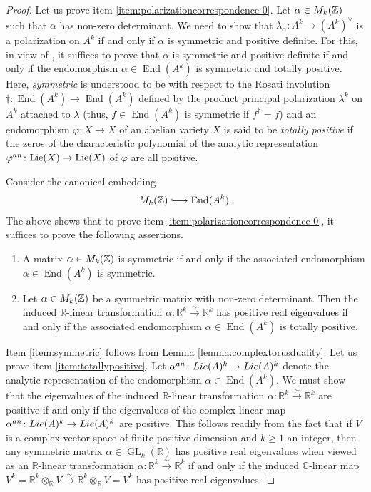 \documentclass[a4paper,11pt,reqno]{amsart}
\newcommand*{\longhookrightarrow}{\ensuremath{\lhook\joinrel\relbar\joinrel\rightarrow}}
\numberwithin{equation}{section}
\theoremstyle{plain}
\theoremstyle{definition}
\newcommand{\Z}{\mathbb Z}
\newcommand{\C}{\mathbb C}
\newcommand{\R}{\mathbb R}
\newcommand{\tn}[1]{{\textnormal{#1}}}
\let\rm\relax
\newcommand{\rm}[1]{{\mathrm{#1}}}
\newcommand{\End}{\operatorname{End}}
\newcommand{\GL}{\operatorname{GL}}
\begin{document}
\begin{proof}
Let us prove item \eqref{item:polarizationcorrespondence-0}. Let $\alpha \in \rm{M}_k(\Z)$ such that $\alpha$ has non-zero determinant. We need to show that $\lambda_\alpha \colon A^k \to (A^k)^\vee$ is a polarization on $A^k$ if and only if $\alpha$ is symmetric and positive definite. 
For this, in view of \cite[Theorem 5.2.4]{birkenhakelange-complexAVs}, it suffices to prove that $\alpha$ is symmetric and positive definite if and only if the endomorphism $\alpha \in \End(A^k)$ is symmetric and totally positive. Here, \emph{symmetric} is understood to be with respect to the Rosati involution $\dagger \colon \End(A^k) \to \End(A^k)$ defined by the product principal polarization $\lambda^k$ on  $A^k$ attached to $\lambda$ (thus, $f \in \End(A^k)$ is symmetric if $f^\dagger = f$) and an endomorphism $\varphi \colon X \to X$ of an abelian variety $X$ is said to be \emph{totally positive} if the zeros of the characteristic polynomial of the analytic representation $\varphi^{an} \colon \tn{Lie}(X) \to \tn{Lie}(X)$ of $\varphi$ are all positive. 

Consider the canonical embedding 
\begin{align*}
\rm{M}_k(\Z) 
\longhookrightarrow
\End(A^k).
\end{align*} 
The above shows that to prove item \eqref{item:polarizationcorrespondence-0}, it suffices to prove the following assertions. 
\begin{enumerate}[label=(\alph*)]
    \item \label{item:symmetric} A matrix $\alpha \in \rm{M}_k(\Z)$ is symmetric if and only if the associated endomorphism $\alpha \in \End(A^k)$ is symmetric. 
    \item\label{item:totallypositive} 
    Let $\alpha \in \rm{M}_k(\Z)$ be a symmetric matrix with non-zero determinant. Then the induced $\R$-linear transformation $\alpha\colon \R^k \xrightarrow{\sim} \R^k$ has positive real eigenvalues if and only if the associated endomorphism  $\alpha \in \End(A^k)$ is totally positive. 
\end{enumerate}
Item \ref{item:symmetric} follows from Lemma \ref{lemma:complextorusduality}. 
Let us prove item \ref{item:totallypositive}.  
 Let $\alpha^{an} \colon \rm{Lie}(A)^k \to \rm{Lie}(A)^k$ denote the analytic representation of the endomorphism $\alpha \in \End(A^k)$.  
We must show that 
the eigenvalues of the induced $\R$-linear transformation $\alpha\colon \R^k \xrightarrow{\sim} \R^k$ are positive if and only if the eigenvalues of the complex linear map $\alpha^{an} \colon \rm{Lie}(A)^k \to \rm{Lie}(A)^k$ are positive. This follows readily from the fact that  
if $V$ is a complex vector space of finite positive dimension and $k \geq 1$ an integer, then any symmetric matrix $\alpha \in \GL_k(\R)$ has positive real eigenvalues when viewed as an $\R$-linear transformation $\alpha \colon \R^k \xrightarrow{\sim} \R^k$ if and only if the induced $\C$-linear map $V^k = \R^k \otimes_\R V \xrightarrow{\sim} \R^k \otimes_\R V= V^k$ has positive real eigenvalues.


\end{proof}
\end{document}
